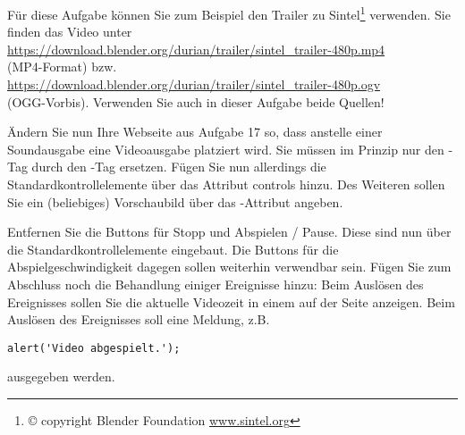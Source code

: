 %
\par Für diese Aufgabe können Sie zum Beispiel den Trailer zu Sintel\footnote{\small{©} copyright Blender Foundation  \textbar \vspace{1em} \url{www.sintel.org}} verwenden. Sie finden das Video unter\\
\url{https://download.blender.org/durian/trailer/sintel_trailer-480p.mp4}
\\(MP4-Format) bzw. \\
\url{https://download.blender.org/durian/trailer/sintel_trailer-480p.ogv} \\
(OGG-Vorbis). Verwenden Sie auch in dieser Aufgabe beide Quellen!
%
\par Ändern Sie nun Ihre Webseite aus Aufgabe 17 so, dass anstelle einer
Soundausgabe eine Videoausgabe platziert wird. Sie müssen im Prinzip nur den
-Tag durch den -Tag ersetzen. Fügen Sie nun allerdings
die Standardkontrollelemente über das Attribut controls hinzu. Des Weiteren
sollen Sie ein (beliebiges) Vorschaubild über das -Attribut
angeben.
%
\par Entfernen Sie die Buttons für Stopp und Abspielen / Pause. Diese sind nun
über die Standardkontrollelemente eingebaut. Die Buttons für die
Abspielgeschwindigkeit dagegen sollen weiterhin verwendbar sein. Fügen Sie zum
Abschluss noch die Behandlung einiger Ereignisse hinzu: Beim Auslösen des
 Ereignisses sollen Sie die aktuelle Videozeit in einem
 auf der Seite anzeigen. Beim Auslösen des  Ereignisses
soll eine Meldung, z.B.
%
\begin{lstlisting}
alert('Video abgespielt.');
\end{lstlisting}
%
ausgegeben werden.